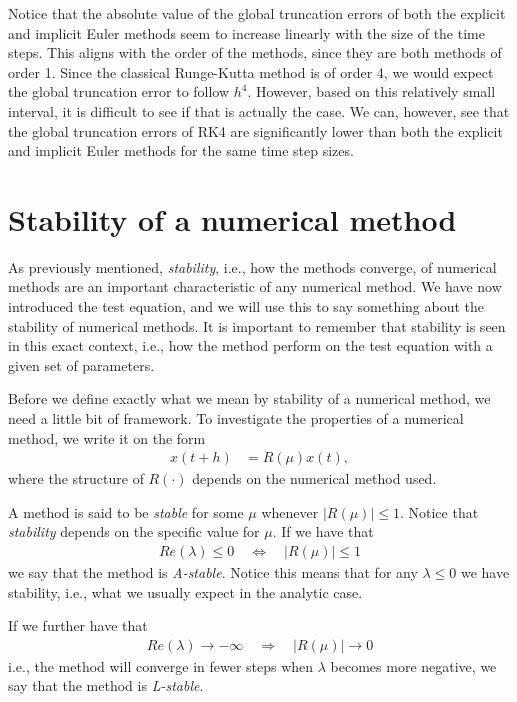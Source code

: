 Notice that the absolute value of the global truncation errors of both the explicit and implicit Euler methods seem to increase linearly with the size of the time steps. This aligns with the order of the methods, since they are both methods of order 1. Since the classical Runge-Kutta method is of order 4, we would expect the global truncation error to follow $h^4$. However, based on this relatively small interval, it is difficult to see if that is actually the case. We can, however, see that the global truncation errors of RK4 are significantly lower than both the explicit and implicit Euler methods for the same time step sizes. 

\section{Stability of a numerical method}
As previously mentioned, \textit{stability}, i.e., how the methods converge, of numerical methods are an important characteristic of any numerical method. We have now introduced the test equation, and we will use this to say something about the stability of numerical methods. It is important to remember that stability is seen in this exact context, i.e., how the method perform on the test equation with a given set of parameters. 

Before we define exactly what we mean by stability of a numerical method, we need a little bit of framework. To investigate the properties of a numerical method, we write it on the form
\begin{align}
    x(t+h) &= R(\mu) x(t),
\end{align}
where the structure of $R(\cdot)$ depends on the numerical method used. 

A method is said to be \textit{stable} for some $\mu$ whenever $|R(\mu)| \leq 1$. Notice that \textit{stability} depends on the specific value for $\mu$. If we have that 
\begin{align}
    Re(\lambda) \leq 0 \quad \Leftrightarrow \quad |R(\mu)| \leq 1
\end{align}
we say that the method is \textit{A-stable}. Notice this means that for any $\lambda \leq 0$ we have stability, i.e., what we usually expect in the analytic case. 

If we further have that 
\begin{align}
    Re(\lambda) \rightarrow -\infty \quad \Rightarrow \quad |R(\mu)| \rightarrow 0
\end{align}
i.e., the method will converge in fewer steps when $\lambda$ becomes more negative, we say that the method is \textit{L-stable}. 


